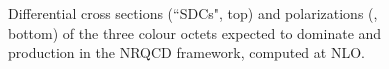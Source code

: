\begin{figure}[h]
\centering
{}
\caption{Differential cross sections (``SDCs", top) and polarizations (\lth, bottom) of the three colour octets
expected to dominate \jpsi and \psip production in the NRQCD framework,
computed at NLO.}
\label{fig:NRQCD}
\end{figure}

